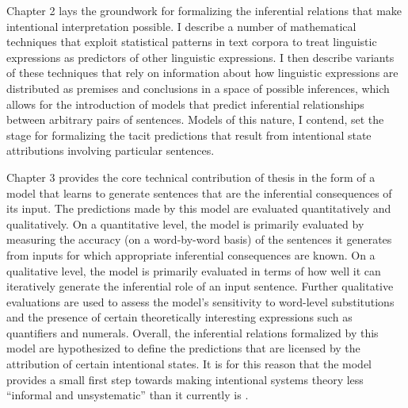 Chapter 2 lays the groundwork for formalizing the inferential relations that make intentional interpretation possible. I describe a number of mathematical techniques that exploit statistical patterns in text corpora to treat linguistic expressions as predictors of other linguistic expressions. I then describe variants of these techniques that rely on information about how linguistic expressions are distributed as premises and conclusions in a space of possible inferences, which allows for the introduction of models that predict inferential relationships between arbitrary pairs of sentences. Models of this nature, I contend, set the stage for formalizing the tacit predictions that result from intentional state attributions involving particular sentences. 

Chapter 3 provides the core technical contribution of thesis in the form of a model that learns to generate sentences that are the inferential consequences of its input. The predictions made by this model are evaluated quantitatively and qualitatively. On a quantitative level, the model is primarily evaluated by measuring the accuracy (on a word-by-word basis) of the sentences it generates from inputs for which appropriate inferential consequences are known. On a qualitative level, the model is primarily evaluated in terms of how well it can iteratively generate the inferential role of an input sentence. Further qualitative evaluations are used to assess the model's sensitivity to word-level substitutions and the presence of certain theoretically interesting expressions such as quantifiers and numerals. Overall, the inferential relations formalized by this model are hypothesized to define the predictions that are licensed by the attribution of certain intentional states. It is for this reason that the model provides a small first step towards making intentional systems theory less ``informal and unsystematic'' than it currently is \citep[][p. 67]{Dennett:1987}.

